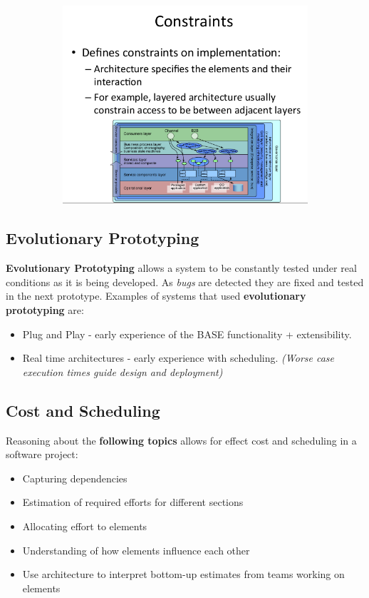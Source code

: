 \documentclass[a4paper]{article}
\begin{document}
\begin{figure}[H]
\hskip-1.5cm\begin{subfigure}{1.1\textwidth}
  \includegraphics[width=1.2\linewidth]
  {images/2-constraints.png}
\end{subfigure}
\end{figure}

\subsection{Evolutionary Prototyping}
\textbf{Evolutionary Prototyping} allows a system to be constantly tested under real conditions as it is being developed. As \textit{bugs} are detected they are fixed and tested in the next prototype. Examples of systems that used \textbf{evolutionary prototyping} are:
\begin{itemize}
\item Plug and Play - early experience of the BASE functionality + extensibility.
\item Real time architectures - early experience with scheduling. \textit{(Worse case execution times guide design and deployment)}
\end{itemize}

\subsection{Cost and Scheduling}
Reasoning about the \textbf{following topics} allows for effect cost and scheduling in a software project:
\begin{itemize}
\item Capturing dependencies
\item Estimation of required efforts for different sections
\item Allocating effort to elements
\item Understanding of how elements influence each other
\item Use architecture to interpret bottom-up estimates from teams working on elements
\end{itemize}
\end{document}
